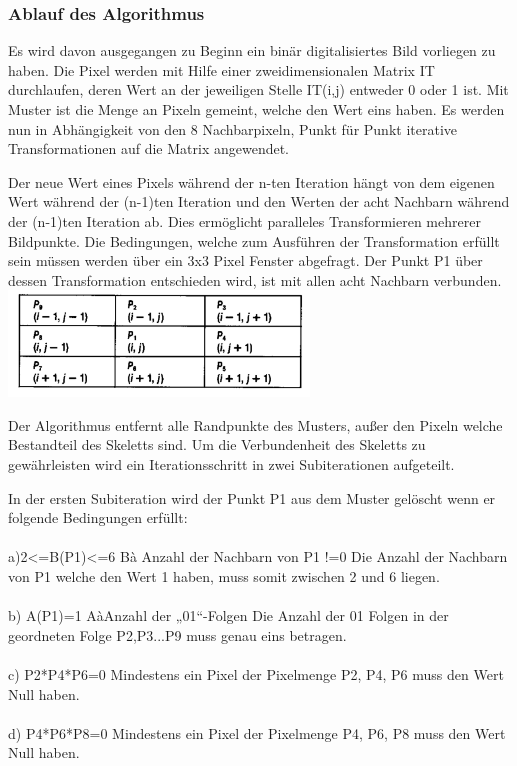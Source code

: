 \documentclass[appendixprefix,a4paper,bibliography=totoc,twoside=true,11pt,DIV=11,BCOR=6mm,headsepline,pointlessnumbers]{scrbook}
\begin{document}
\subsubsection{Ablauf des Algorithmus}

Es wird davon ausgegangen zu Beginn ein binär digitalisiertes Bild vorliegen zu haben.
Die Pixel werden mit Hilfe einer zweidimensionalen Matrix IT durchlaufen, deren Wert an der jeweiligen Stelle IT(i,j) entweder 0 oder 1 ist.
Mit Muster ist die Menge an Pixeln gemeint, welche den Wert eins haben.
Es werden nun in Abhängigkeit von den 8 Nachbarpixeln, Punkt für Punkt iterative Transformationen auf die Matrix angewendet.

Der neue Wert eines Pixels während der n-ten Iteration hängt von dem eigenen Wert während der (n-1)ten Iteration und den Werten der acht Nachbarn während der (n-1)ten Iteration ab. Dies ermöglicht paralleles Transformieren mehrerer Bildpunkte. 
Die Bedingungen, welche zum Ausführen der Transformation erfüllt sein müssen werden über ein 3x3 Pixel Fenster abgefragt. Der Punkt P1 über dessen Transformation entschieden wird, ist mit allen acht Nachbarn verbunden.\\

\includegraphics[width=8cm]{Res/PixelNachbarschaft.png}


Der Algorithmus entfernt alle Randpunkte des Musters, außer den Pixeln welche Bestandteil des Skeletts sind. Um die Verbundenheit des Skeletts zu gewährleisten wird ein  Iterationsschritt in zwei Subiterationen aufgeteilt.

In der ersten Subiteration wird der Punkt P1 aus dem Muster gelöscht wenn er folgende Bedingungen erfüllt:\\ \\
a)2<=B(P1)<=6     
Bà Anzahl der Nachbarn von P1 !=0
Die Anzahl der Nachbarn von P1 welche den Wert 1 haben, muss somit zwischen 2 und 6 liegen.\\ \\
b) A(P1)=1
AàAnzahl der „01“-Folgen 
Die Anzahl der 01 Folgen in der geordneten Folge P2,P3...P9 muss genau eins betragen.\\ \\
c) P2*P4*P6=0  
Mindestens ein Pixel der Pixelmenge P2, P4, P6 muss den Wert Null haben.\\ \\
d) P4*P6*P8=0
Mindestens ein Pixel der Pixelmenge P4, P6, P8 muss den Wert Null haben.
\\
\end{document}
